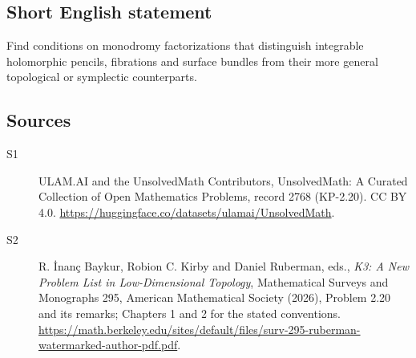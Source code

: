 \documentclass[11pt]{article}
\begin{document}
\subsection{Short English statement}
Find conditions on monodromy factorizations that distinguish integrable holomorphic pencils, fibrations and surface bundles from their more general topological or symplectic counterparts.
\subsection{Sources}
\begin{description}
\item[\hypertarget{source:2768:1}{S1}] ULAM.AI and the UnsolvedMath Contributors, UnsolvedMath: A Curated Collection of Open Mathematics Problems, record 2768 (KP-2.20). CC BY 4.0. \url{https://huggingface.co/datasets/ulamai/UnsolvedMath}.
\item[\hypertarget{source:2768:2}{S2}] R. İnanç Baykur, Robion C. Kirby and Daniel Ruberman, eds., \emph{K3: A New Problem List in Low-Dimensional Topology}, Mathematical Surveys and Monographs 295, American Mathematical Society (2026), Problem 2.20 and its remarks; Chapters 1 and 2 for the stated conventions. \url{https://math.berkeley.edu/sites/default/files/surv-295-ruberman-watermarked-author-pdf.pdf}.
\end{description}
\label{end:2768}
\end{document}
